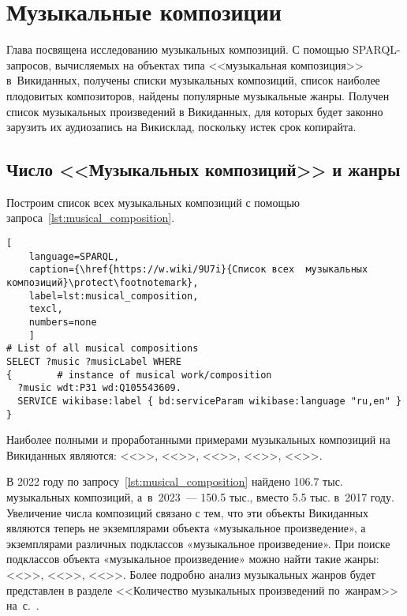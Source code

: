 \chapter{Музыкальные композиции}
\label{ch:musical-composition}
Глава посвящена исследованию музыкальных композиций. 
С помощью SPARQL-запросов, вычисляемых на объектах типа <<музыкальная композиция>> в~Викиданных, 
получены списки музыкальных композиций, список наиболее плодовитых композиторов, 
найдены популярные музыкальные жанры. 
Получен список музыкальных произведений в Викиданных, 
для которых будет законно зарузить их аудиозапись на Викисклад, поскольку истек срок копирайта.

\section{Число <<Музыкальных композиций>> и жанры}


Построим список всех музыкальных композиций с помощью запроса~\ref{lst:musical_composition}.

\begin{lstlisting}[ 
    language=SPARQL,
    caption={\href{https://w.wiki/9U7i}{Список всех  музыкальных композиций}\protect\footnotemark},
    label=lst:musical_composition,
    texcl,
    numbers=none
    ]
# List of all musical compositions
SELECT ?music ?musicLabel WHERE
{        # instance of musical work/composition
  ?music wdt:P31 wd:Q105543609. 
  SERVICE wikibase:label { bd:serviceParam wikibase:language "ru,en" }
}
\end{lstlisting}%

Наиболее полными и проработанными примерами музыкальных композиций на Викиданных являются: <<>>, <<>>, <<>>, <<>>, <<>>.

В 2022 году по запросу~\ref{lst:musical_composition} найдено \num{106,7} тыс. музыкальных композиций, 
а~в~2023~--- \num{150,5} тыс., вместо \num{5,5} тыс. в~2017 году. 
Увеличение числа композиций связано с тем, что эти объекты Викиданных являются теперь не экземплярами объекта «музыкальное произведение», а экземплярами различных подклассов «музыкальное произведение». При поиске подклассов объекта «музыкальное произведение» можно найти такие жанры: <<>>, <<>>, <<>>. Более подробно анализ музыкальных жанров будет представлен в разделе <<Количество музыкальных произведений по~жанрам>> на~с.~\pageref{chapter:Number-of-musical-works-by-genre}.

